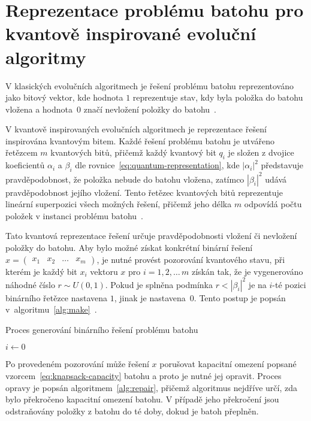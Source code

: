 \section{Reprezentace problému batohu pro kvantově inspirované evoluční algoritmy}
V klasických evolučních algoritmech je řešení problému batohu reprezentováno jako bitový vektor, kde hodnota $1$ reprezentuje stav, kdy byla položka do batohu vložena a hodnota~$0$ značí nevložení položky do batohu~\cite{qiga}.

V kvantově inspirovaných evolučních algoritmech je reprezentace řešení inspirována kvantovým bitem. 
Každé řešení problému batohu je utvářeno řetězcem $m$ kvantových bitů, přičemž každý kvantový bit $q_i$ je složen z dvojice koeficientů $\alpha_i$ a $\beta_i$ dle rovnice~\ref{eq:quantum-representation}, kde $\left| \alpha_i \right|^2$ představuje pravděpodobnost, že položka nebude do batohu vložena, zatímco $\left| \beta_i \right|^2$ udává pravděpodobnost jejího vložení. 
Tento řetězec kvantových bitů reprezentuje lineární superpozici všech možných řešení, přičemž jeho délka $m$ odpovídá počtu položek v instanci problému batohu~\cite{qiga}.

Tato kvantová reprezentace řešení určuje pravděpodobnosti vložení či nevložení položky do batohu. 
Aby bylo možné získat konkrétní binární řešení $x = \begin{pmatrix} x_1 & x_2 & \dots & x_m \end{pmatrix}$, je nutné provést pozorování kvantového stavu, při kterém je každý bit $x_i$ vektoru $x$ pro $i = 1,2,\dots\,m$ získán tak, že je vygenerováno náhodné číslo $r \sim U\left(0,1\right)$. 
Pokud je splněna podmínka $r < \left| \beta_i \right|^2$ je na $i$-té pozici binárního řetězce nastavena $1$, jinak je nastavena~$0$. 
Tento postup je popsán v~algoritmu~\ref{alg:make}~\cite{qiga}.

\begin{algorithm}[H]
    \caption{Proces generování binárního řešení problému batohu~\cite{qiga}}
    \label{alg:make}
    $i \gets 0$\;
\end{algorithm}

Po provedeném pozorování může řešení $x$ porušovat kapacitní omezení popsané vzorcem~\ref{eq:knapsack-capacity} batohu a proto je nutné jej opravit. 
Proces opravy je popsán algoritmem~\ref{alg:repair}, přičemž algoritmus nejdříve určí, zda bylo překročeno kapacitní omezení batohu. 
V případě jeho překročení jsou odstraňovány položky z batohu do té doby, dokud je batoh přeplněn. 

